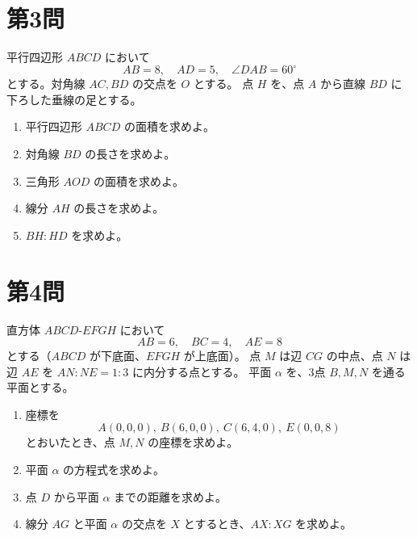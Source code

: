 \documentclass[a4paper,12pt]{jsarticle}
\begin{document}
\section*{第3問}
平行四辺形 $ABCD$ において
\[
AB=8,\quad AD=5,\quad \angle DAB=60^\circ
\]
とする。対角線 $AC,BD$ の交点を $O$ とする。  
点 $H$ を、点 $A$ から直線 $BD$ に下ろした垂線の足とする。

\begin{enumerate}[label=\arabic*.]
  \item 平行四辺形 $ABCD$ の面積を求めよ。
  \item 対角線 $BD$ の長さを求めよ。
  \item 三角形 $AOD$ の面積を求めよ。
  \item 線分 $AH$ の長さを求めよ。
  \item $BH:HD$ を求めよ。
\end{enumerate}

\section*{第4問}
直方体 $ABCD\text{-}EFGH$ において
\[
AB=6,\quad BC=4,\quad AE=8
\]
とする（$ABCD$ が下底面、$EFGH$ が上底面）。  
点 $M$ は辺 $CG$ の中点、点 $N$ は辺 $AE$ を $AN:NE=1:3$ に内分する点とする。  
平面 $\alpha$ を、3点 $B,M,N$ を通る平面とする。

\begin{enumerate}[label=\arabic*.]
  \item 座標を
  \[
  A(0,0,0),\ B(6,0,0),\ C(6,4,0),\ E(0,0,8)
  \]
  とおいたとき、点 $M,N$ の座標を求めよ。
  \item 平面 $\alpha$ の方程式を求めよ。
  \item 点 $D$ から平面 $\alpha$ までの距離を求めよ。
  \item 線分 $AG$ と平面 $\alpha$ の交点を $X$ とするとき、$AX:XG$ を求めよ。
\end{enumerate}
\end{document}
